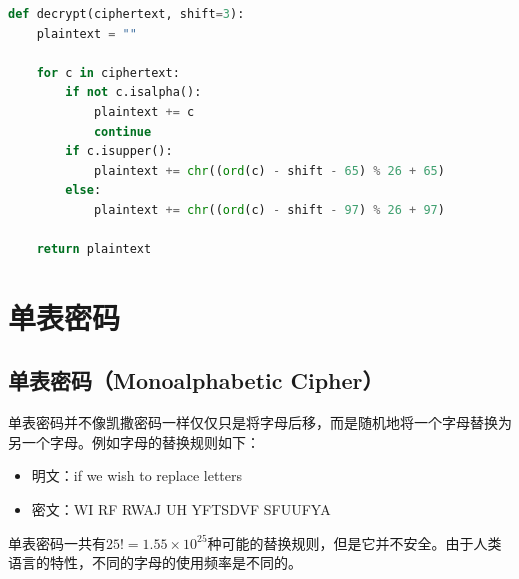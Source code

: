 \vspace{0.5cm}


\begin{lstlisting}[language=Python]
def decrypt(ciphertext, shift=3):
    plaintext = ""

    for c in ciphertext:
        if not c.isalpha():
            plaintext += c
            continue
        if c.isupper():
            plaintext += chr((ord(c) - shift - 65) % 26 + 65)
        else:
            plaintext += chr((ord(c) - shift - 97) % 26 + 97)

    return plaintext
\end{lstlisting}

\newpage

\section{单表密码}

\subsection{单表密码（Monoalphabetic Cipher）}

单表密码并不像凯撒密码一样仅仅只是将字母后移，而是随机地将一个字母替换为另一个字母。例如字母的替换规则如下：

\begin{table}[H]
    \centering
\end{table}

\begin{itemize}
    \item 明文：if we wish to replace letters
    \item 密文：WI RF RWAJ UH YFTSDVF SFUUFYA
\end{itemize}

单表密码一共有$ 25! = 1.55 \times 10^{25} $种可能的替换规则，但是它并不安全。由于人类语言的特性，不同的字母的使用频率是不同的。\\

